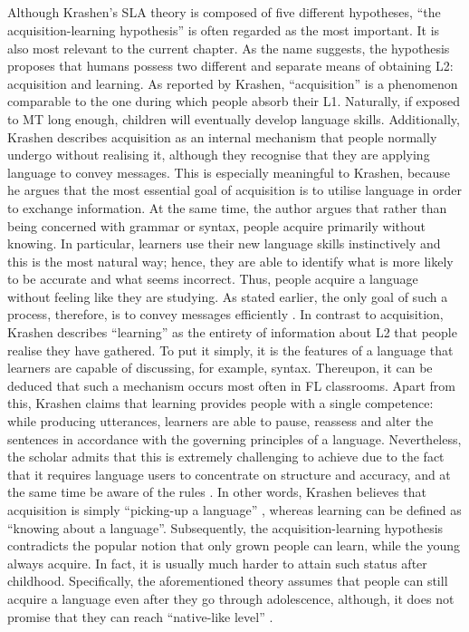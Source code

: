 \documentclass{article}
\begin{document}
\subsection{}
Although Krashen’s SLA theory is composed of five different hypotheses, “the acquisition-learning hypothesis” \cite{krashen_principles_1982} is often regarded as the most important. It is also most relevant to the current chapter. As the name suggests, the hypothesis proposes that humans possess two different and separate means of obtaining L2: acquisition and learning.
As reported by Krashen, “acquisition” \cite{krashen_principles_1982} is a phenomenon comparable to the one during which people absorb their L1. Naturally, if exposed to MT long enough, children will eventually develop language skills. Additionally, Krashen describes acquisition as an internal mechanism that people normally undergo without realising it, although they recognise that they are applying language to convey messages. This is especially meaningful to Krashen, because he argues that the most essential goal of acquisition is to utilise language in order to exchange information. At the same time, the author argues that rather than being concerned with grammar or syntax, people acquire primarily without knowing. In particular, learners use their new language skills instinctively and this is the most natural way; hence, they are able to identify what is more likely to be accurate and what seems incorrect. Thus, people acquire a language without feeling like they are studying. As stated earlier, the only goal of such a process, therefore, is to convey messages efficiently \cite{krashen_principles_1982}.
In contrast to acquisition, Krashen describes “learning” \cite{krashen_language_1989} as the entirety of information about L2 that people realise they have gathered. To put it simply, it is the features of a language that learners are capable of discussing, for example, syntax. Thereupon, it can be deduced that such a mechanism occurs most often in FL classrooms. Apart from this, Krashen claims that learning provides people with a single competence: while producing utterances, learners are able to pause, reassess and alter the sentences in accordance with the governing principles of a language. Nevertheless, the scholar admits that this is extremely challenging to achieve due to the fact that it requires language users to concentrate on structure and accuracy, and at the same time be aware of the rules \cite{krashen_language_1989}.
	In other words, Krashen believes that acquisition is simply “picking-up a language” \cite{krashen_principles_1982}, whereas learning can be defined as “knowing about a language”. Subsequently, the acquisition-learning hypothesis contradicts the popular notion that only grown people can learn, while the young always acquire. In fact, it is usually much harder to attain such status after childhood. Specifically, the aforementioned theory assumes that people can still acquire a language even after they go through adolescence, although, it does not promise that they can reach “native-like level” \cite{krashen_principles_1982}. 
\end{document}
